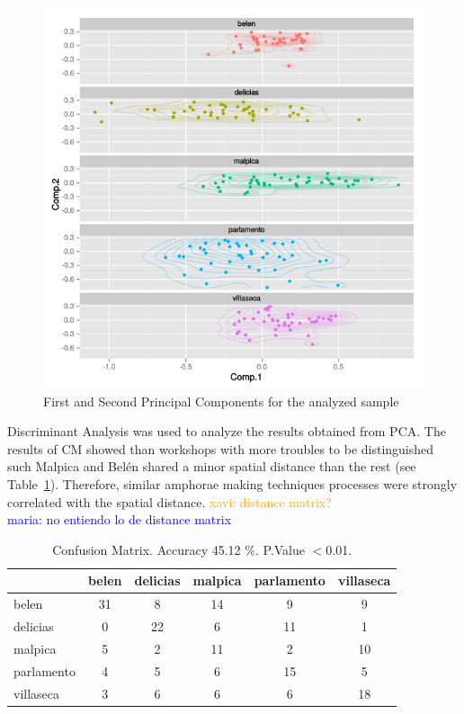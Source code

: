 \documentclass[review]{elsarticle}
\newcommand{\memo}[2]{\textcolor{#1}{#2}}
\newcommand{\xavi}[1]{\memo{orange}{xavi: #1\\}}
\newcommand{\maria}[1]{\memo{blue}{maria: #1\\}}
\begin{document}
\begin{figure}[htp]
	\centering
\includegraphics[scale=0.45]{pca.png}
\caption{First and Second Principal Components for the analyzed sample}
\label{pca}
\end{figure} 



Discriminant Analysis was used to analyze the results obtained from PCA. The results of CM showed than workshops with more troubles to be distinguished such Malpica and Bel\'en shared a minor spatial distance than the rest (see Table~\ref{table:confusion}). Therefore, similar amphorae making techniques processes were strongly correlated with the spatial distance. 
\xavi{distance matrix?} \maria{no entiendo lo de distance matrix}

\begin{table}[htp]
\begin{tabular}{lccccc}
\hline
 & belen & delicias & malpica & parlamento & villaseca\\ \hline
belen & 31 &       8 &      14 &          9 &          9 \\
delicias       & 0 &        22 &       6&         11&         1 \\
malpica &       5  &     2  &    11   &       2  &      10 \\
parlamento &     4  &      5 &      6 &        15 &        5\\
villaseca   &   3   &     6   &    6  &        6  &     18 \\
\hline

\end{tabular}
\caption{Confusion Matrix. Accuracy 45.12 $\%$. P.Value $<$0.01. }
\label{table:confusion}
\end{table}
\end{document}
